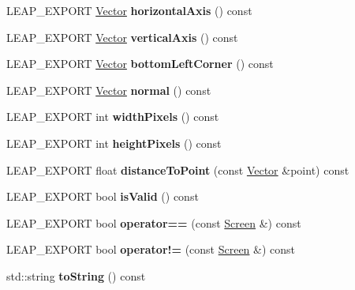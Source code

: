 \begin{DoxyCompactItemize}
L\+E\+A\+P\+\_\+\+E\+X\+P\+O\+RT \hyperlink{struct_leap_1_1_vector}{Vector} {\bfseries horizontal\+Axis} () const
\item 
\mbox{\label{class_leap_1_1_screen_aa83910ada42bd75c20f6814ee6a7a308}} 
L\+E\+A\+P\+\_\+\+E\+X\+P\+O\+RT \hyperlink{struct_leap_1_1_vector}{Vector} {\bfseries vertical\+Axis} () const
\item 
\mbox{\label{class_leap_1_1_screen_a6ee7f327bb42acdf7b12fcc347485ccd}} 
L\+E\+A\+P\+\_\+\+E\+X\+P\+O\+RT \hyperlink{struct_leap_1_1_vector}{Vector} {\bfseries bottom\+Left\+Corner} () const
\item 
\mbox{\label{class_leap_1_1_screen_a757749f24eccf155f1aaf2975e32c0ea}} 
L\+E\+A\+P\+\_\+\+E\+X\+P\+O\+RT \hyperlink{struct_leap_1_1_vector}{Vector} {\bfseries normal} () const
\item 
\mbox{\label{class_leap_1_1_screen_a39872f618517d0ed6281f5ad53d48120}} 
L\+E\+A\+P\+\_\+\+E\+X\+P\+O\+RT int {\bfseries width\+Pixels} () const
\item 
\mbox{\label{class_leap_1_1_screen_a9c701328f24a60b0fb3029f8e70d5b79}} 
L\+E\+A\+P\+\_\+\+E\+X\+P\+O\+RT int {\bfseries height\+Pixels} () const
\item 
\mbox{\label{class_leap_1_1_screen_aa2bf539ea4b44afdc06162611a71a2d1}} 
L\+E\+A\+P\+\_\+\+E\+X\+P\+O\+RT float {\bfseries distance\+To\+Point} (const \hyperlink{struct_leap_1_1_vector}{Vector} \&point) const
\item 
\mbox{\label{class_leap_1_1_screen_aa0ba073c105a81b4888390acb528914f}} 
L\+E\+A\+P\+\_\+\+E\+X\+P\+O\+RT bool {\bfseries is\+Valid} () const
\item 
\mbox{\label{class_leap_1_1_screen_a75c4150f2ff1adbc4ce466a3ca9c7b52}} 
L\+E\+A\+P\+\_\+\+E\+X\+P\+O\+RT bool {\bfseries operator==} (const \hyperlink{class_leap_1_1_screen}{Screen} \&) const
\item 
\mbox{\label{class_leap_1_1_screen_aaa159c7b37dd7c1e9df0c73261ac6dbe}} 
L\+E\+A\+P\+\_\+\+E\+X\+P\+O\+RT bool {\bfseries operator!=} (const \hyperlink{class_leap_1_1_screen}{Screen} \&) const
\item 
\mbox{\label{class_leap_1_1_screen_a961f7d6aa8ff5e67f6bc4c1c6e13d53f}} 
std\+::string {\bfseries to\+String} () const
\end{DoxyCompactItemize}
